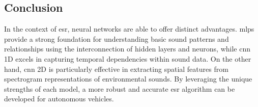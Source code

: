 \subsection{Conclusion}
\label{sec:frmwk_neural_networks_conclusion}

In the context of \gls{esr}, neural networks are able to offer distinct advantages. \gls{mlp}s provide a strong foundation for understanding basic sound patterns and relationships using the interconnection of hidden layers and neurons, while \gls{cnn} 1D excels in capturing temporal dependencies within sound data. On the other hand, \gls{cnn} 2D is particularly effective in extracting spatial features from spectrogram representations of environmental sounds. By leveraging the unique strengths of each model, a more robust and accurate \gls{esr} algorithm can be developed for autonomous vehicles.





